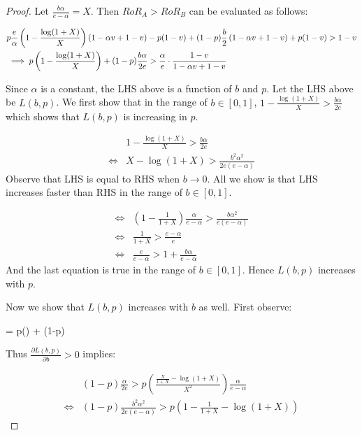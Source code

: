 \begin{proof}

Let $\frac{b\alpha}{e-\alpha} = X$. Then $RoR_A > RoR_B$ can be evaluated as follows:

\begin{eqnarray}
& p\frac{e}{\alpha}\left(1-\frac{\log(1+X)}{X}\right)(1-\alpha v + 1 - v) - p(1-v) + (1-p)\frac{b}{2}\left(1-\alpha v + 1-v\right) + p(1-v) > 1-v\notag\\
& \implies p\left(1 - \frac{\log(1+X)}{X}\right) + (1-p)\frac{b\alpha}{2e} > \frac{\alpha}{e} \cdot \frac{1-v}{1-\alpha v + 1 - v}\label{eq:ra>rb}
\end{eqnarray}

Since $\alpha$ is a constant, the LHS above is a function of $b$ and $p$. 
Let the LHS above be $L(b,p)$.
We first show that in the range of $b\in [0,1]$, $1 - \frac{\log(1+X)}{X} > \frac{b\alpha}{2e}$ which shows that $L(b,p)$ is increasing in $p$.

\begin{align*}
& 1-\frac{\log(1+X)}{X} > \frac{b\alpha}{2e}\\
\Leftrightarrow & X - \log(1+X) > \frac{b^2\alpha^2}{2e(e-\alpha)}
\end{align*}
Observe that LHS is equal to RHS when $b\rightarrow 0$. 
All we show is that LHS increases faster than RHS in the range of $b\in [0,1]$. 

\begin{align*}
\Leftrightarrow & \left(1 - \frac{1}{1+X}\right) \frac{\alpha}{e-\alpha} > \frac{b\alpha^2}{e(e-\alpha)}\\
\Leftrightarrow & \frac{1}{1+X} > \frac{e-\alpha}{e}\\
\Leftrightarrow & \frac{e}{e-\alpha} > 1 + \frac{b\alpha}{e-\alpha}
\end{align*}
And the last equation is true in the range of $b\in [0,1]$. Hence $L(b,p)$ increases with $p$.

Now we show that $L(b,p)$ increases with $b$ as well. First observe:

\beq
{} = p\left(\right) + (1-p)
\notag
\eeq

Thus $\frac{\partial L(b,p)}{\partial b} > 0$ implies:

\begin{align*}
& (1-p)\frac{\alpha}{2e} > p\left(\frac{\frac{X}{1+X} - \log(1+X)}{X^2}\right)\frac{\alpha}{e-\alpha}\\
\Leftrightarrow & (1-p)\frac{b^2\alpha^2}{2e(e-\alpha)} > p \left(1 - \frac{1}{1+X} - \log(1+X)\right)
\end{align*}


\end{proof}
